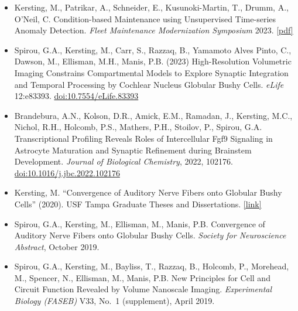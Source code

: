 \documentclass[10pt, letterpaper]{article}
\begin{document}
\begin{itemize}[itemsep=6pt]
    \item Kersting, M., Patrikar, A., Schneider, E., Kusunoki-Martin, T., Drumm, A., O'Neil, C. Condition-based Maintenance using Unsupervised Time-series Anomaly Detection. \textit{Fleet Maintenance Modernization Symposium} 2023. \href{https://noblis.org/wp-content/uploads/2023/09/CBM_UTSAD_Manuscript_3.pdf}{[pdf]}

    \item Spirou, G.A., Kersting, M., Carr, S., Razzaq, B., Yamamoto Alves Pinto, C., Dawson, M., Ellisman, M.H., Manis, P.B. (2023) High-Resolution Volumetric Imaging Constrains Compartmental Models to Explore Synaptic Integration and Temporal Processing by Cochlear Nucleus Globular Bushy Cells. \textit{eLife} 12:e83393. \href{https://doi.org/10.7554/eLife.83393}{doi:10.7554/eLife.83393}

    \item Brandebura, A.N., Kolson, D.R., Amick, E.M., Ramadan, J., Kersting, M.C., Nichol, R.H., Holcomb, P.S., Mathers, P.H., Stoilov, P., Spirou, G.A. Transcriptional Profiling Reveals Roles of Intercellular Fgf9 Signaling in Astrocyte Maturation and Synaptic Refinement during Brainstem Development. \textit{Journal of Biological Chemistry}, 2022, 102176. \href{https://doi.org/10.1016/j.jbc.2022.102176}{doi:10.1016/j.jbc.2022.102176}

    \item Kersting, M. ``Convergence of Auditory Nerve Fibers onto Globular Bushy Cells'' (2020). USF Tampa Graduate Theses and Dissertations. \href{https://digitalcommons.usf.edu/etd/9543}{[link]}

    \item Spirou, G.A., Kersting, M., Ellisman, M., Manis, P.B. Convergence of Auditory Nerve Fibers onto Globular Bushy Cells. \textit{Society for Neuroscience Abstract}, October 2019.

    \item Spirou, G.A., Kersting, M., Bayliss, T., Razzaq, B., Holcomb, P., Morehead, M., Spencer, N., Ellisman, M., Manis, P.B. New Principles for Cell and Circuit Function Revealed by Volume Nanoscale Imaging. \textit{Experimental Biology (FASEB)} V33, No.\ 1 (supplement), April 2019.
\end{itemize}
\end{document}
